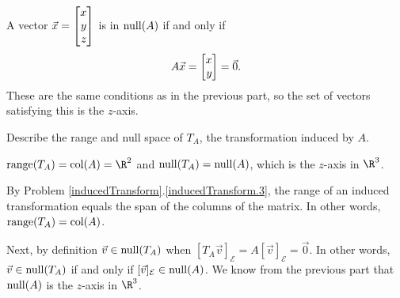 \begin{parts}
\begin{solution}
				A vector $\vec x=\mat{x\\y\\z}$ is in $\operatorname{null}(A)$ if
				and only if
				\[
					A\vec x = \mat{x\\y} = \vec 0.
				\]
				These are the same conditions as in the previous part, so the set
				of vectors satisfying this is the $z$-axis.
			\end{solution}
		\item Describe the range and null space of $T_A$, the transformation
			induced by $A$.
			\label{fundamentalSubspaces.6}
			\begin{solution}
				$\Range(T_A)=\Col(A)=\R^2$ and $\operatorname{null}(T_A)=\operatorname{null}(A)$,
				which is the $z$-axis in $\R^3$.

				By Problem \ref{inducedTransform}.\ref{inducedTransform.3}, the
				range of an induced transformation equals the span of the columns
				of the matrix. In other words, $\operatorname{range}(T_A)=\operatorname{col}(A)$.

				Next, by definition $\vec v\in\operatorname{null}(T_A)$ when
				$[T_A\vec v]_{\mathcal E}=A[\vec v]_{\mathcal E}=\vec 0$.
				In other words, $\vec v\in\operatorname{null}(T_A)$ if and only if
				$[\vec v]_{\mathcal E}\in\operatorname{null}(A)$. We know from the previous
				part that $\operatorname{null}(A)$ is the $z$-axis in $\R^3$.
			\end{solution}
	\end{parts}

